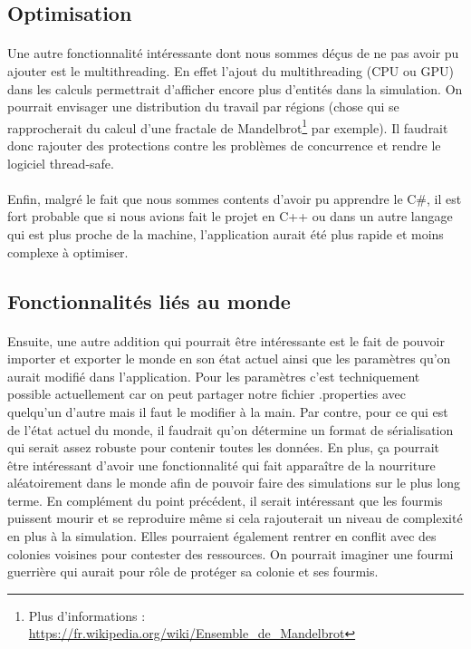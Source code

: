 \documentclass{EPUProjetDi}
\begin{document}
\subsection{Optimisation}
\paragraph{}
Une autre fonctionnalité intéressante dont nous sommes déçus de ne pas avoir pu ajouter est le multithreading. En effet l'ajout du multithreading (CPU ou GPU) dans les calculs permettrait d'afficher 
encore plus d'entités dans la simulation. On pourrait envisager une distribution du travail par régions 
(chose qui se rapprocherait du calcul d'une fractale de Mandelbrot\footnote{Plus d'informations : \url{https://fr.wikipedia.org/wiki/Ensemble_de_Mandelbrot}} par exemple).
Il faudrait donc rajouter des protections contre les problèmes de concurrence et rendre le logiciel thread-safe. 

\paragraph{}
Enfin, malgré le fait que nous sommes contents d'avoir pu apprendre le C\#, il est fort probable que si nous avions fait le projet en C++ 
ou dans un autre langage qui est plus proche de la machine, l'application aurait été plus rapide et moins complexe à optimiser.

\subsection{Fonctionnalités liés au monde}
\paragraph{}
Ensuite, une autre addition qui pourrait être intéressante est le fait de pouvoir importer et exporter le monde en son état actuel ainsi que les paramètres qu'on aurait modifié dans l'application.
Pour les paramètres c'est techniquement possible actuellement car on peut partager notre fichier .properties avec quelqu'un d'autre mais il faut le modifier à la main. 
Par contre, pour ce qui est de l'état actuel du monde, il faudrait qu'on détermine un format de sérialisation qui serait assez robuste pour contenir toutes les données.
En plus, ça pourrait être intéressant d'avoir une fonctionnalité qui fait apparaître de la nourriture aléatoirement dans le monde afin de pouvoir faire des simulations sur le plus long terme.
En complément du point précédent, il serait intéressant que les fourmis puissent mourir et se reproduire même si cela rajouterait un niveau de complexité en plus à la simulation. 
Elles pourraient également rentrer en conflit avec des colonies voisines pour contester des ressources. On pourrait imaginer une fourmi guerrière qui aurait pour rôle de protéger sa colonie et ses fourmis.
\end{document}
